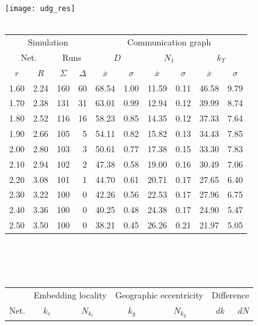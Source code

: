 \documentclass{article}
\begin{document}
\begin{figure}[h]
\begin{center}
\texttt{[image: udg\_res]}
~\\~\\
\begin{tabular}{|rr|rr|rr|rr|rr|}
\hline
\multicolumn{4}{|c|}{Simulation} & \multicolumn{6}{|c|}{Communication graph}\\
\multicolumn{2}{|c}{Net.} & \multicolumn{2}{c|}{Runs} & \multicolumn{2}{|c}{$D$} & \multicolumn{2}{c}{$N_1$} & \multicolumn{2}{c|}{$k_T$}\\
\hline
\multicolumn{1}{|c}{$r$} & \multicolumn{1}{c|}{$R$} & \multicolumn{1}{|c}{$\Sigma$} & \multicolumn{1}{c|}{$\Delta$} & \multicolumn{1}{|c}{$\overline{x}$} & \multicolumn{1}{c|}{$\sigma$} & \multicolumn{1}{|c}{$\overline{x}$} & \multicolumn{1}{c|}{$\sigma$} & \multicolumn{1}{|c}{$\overline{x}$} & \multicolumn{1}{c|}{$\sigma$}\\
1.60 & 2.24 & 160 & 60 & 68.54 & 1.00 & 11.59 & 0.11 & 46.58 & 9.79\\
1.70 & 2.38 & 131 & 31 & 63.01 & 0.99 & 12.94 & 0.12 & 39.99 & 8.74\\
1.80 & 2.52 & 116 & 16 & 58.23 & 0.85 & 14.35 & 0.12 & 37.33 & 7.64\\
1.90 & 2.66 & 105 &  5 & 54.11 & 0.82 & 15.82 & 0.13 & 34.43 & 7.85\\
2.00 & 2.80 & 103 &  3 & 50.61 & 0.77 & 17.38 & 0.15 & 33.30 & 7.83\\
2.10 & 2.94 & 102 &  2 & 47.38 & 0.58 & 19.00 & 0.16 & 30.49 & 7.06\\
2.20 & 3.08 & 101 &  1 & 44.70 & 0.61 & 20.71 & 0.17 & 27.65 & 6.40\\
2.30 & 3.22 & 100 &  0 & 42.26 & 0.56 & 22.53 & 0.17 & 27.96 & 6.75\\
2.40 & 3.36 & 100 &  0 & 40.25 & 0.48 & 24.38 & 0.17 & 24.90 & 5.47\\
2.50 & 3.50 & 100 &  0 & 38.21 & 0.45 & 26.26 & 0.21 & 21.97 & 5.05\\
\hline
\end{tabular}\\
~\\~\\
\begin{tabular}{|r|rr|rr|rr|rr|rr|}
\hline
& \multicolumn{4}{|c|}{Embedding locality} & \multicolumn{4}{|c|}{Geographic eccentricity} & \multicolumn{2}{|c|}{Difference}\\
Net. & \multicolumn{2}{c}{$k_e$} & \multicolumn{2}{c|}{$N_{k_e}$} & \multicolumn{2}{c}{$k_g$} & \multicolumn{2}{c|}{$N_{k_g}$}& $dk$ & $dN$\\

\end{tabular}
\end{center}
\end{figure}
\end{document}
